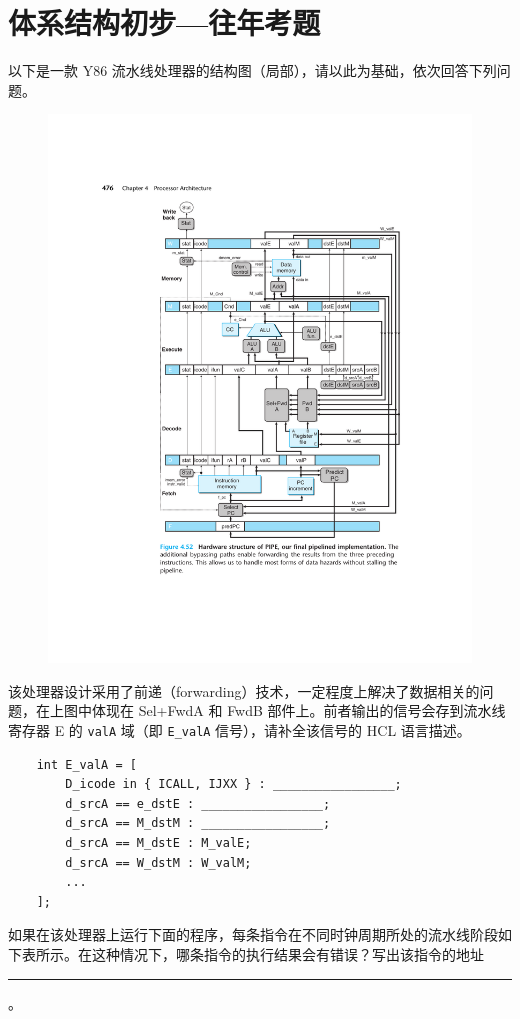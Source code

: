\chapter{体系结构初步{---}往年考题}\thispagestyle{empty}
    \begin{problems}
         以下是一款 Y86 流水线处理器的结构图（局部），请以此为基础，依次回答下列问题。
        \begin{figure}[H]
            \centering
            \includegraphics[width=0.75\linewidth]{pipe.pdf}
        \end{figure}
            \qn 该处理器设计采用了前递（forwarding）技术，一定程度上解决了数据相关的问题，在上图中体现在 Sel+FwdA 和 FwdB 部件上。前者输出的信号会存到流水线寄存器 E 的 \verb|valA| 域（即 \verb|E_valA| 信号），请补全该信号的 HCL 语言描述。
            \begin{verbatim}
    int E_valA = [
        D_icode in { ICALL, IJXX } : _________________;
        d_srcA == e_dstE : _________________;
        d_srcA == M_dstM : _________________;
        d_srcA == M_dstE : M_valE;
        d_srcA == W_dstM : W_valM;
        ...
    ];
            \end{verbatim}
            \qn 如果在该处理器上运行下面的程序，每条指令在不同时钟周期所处的流水线阶段如下表所示。在这种情况下，哪条指令的执行结果会有错误？写出该指令的地址 \rule{2.5cm}{0.25mm}。

\end{problems}
